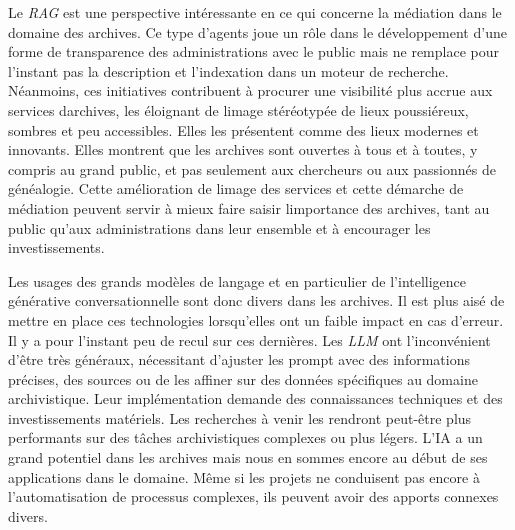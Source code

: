 		
		Le \emph{RAG} est une perspective intéressante en ce qui concerne la médiation dans le domaine des
	archives. Ce type d'agents joue
	un rôle dans le développement d'une forme de transparence des
	administrations avec le public mais ne remplace pour l'instant pas la
	description et l'indexation dans un moteur de recherche. Néanmoins, ces
	initiatives contribuent à procurer une visibilité plus accrue aux
	services d\textquotesingle archives, les éloignant de
	l\textquotesingle image stéréotypée de lieux poussiéreux, sombres et peu
	accessibles. Elles les présentent comme des lieux modernes et innovants.
	Elles montrent que les archives sont ouvertes à tous et à toutes, y compris au grand
	public, et pas seulement aux chercheurs ou aux passionnés de généalogie.
	Cette amélioration de l\textquotesingle image des services et cette
	démarche de médiation peuvent servir à mieux faire saisir
	l\textquotesingle importance des archives, tant au public qu'aux
	administrations dans leur ensemble et à encourager les
	investissements.\newline
	
	Les usages des grands modèles de langage et en particulier de
	l'intelligence générative conversationnelle sont donc divers dans les
	archives. Il est plus aisé de mettre en place ces technologies
	lorsqu'elles ont un faible impact en cas d'erreur. Il y a pour l'instant
	peu de recul sur ces dernières. Les \emph{LLM} ont l'inconvénient d'être
	très généraux, nécessitant d'ajuster les prompt avec des informations
	précises, des sources ou de les affiner sur des données spécifiques au
	domaine archivistique. Leur implémentation demande des connaissances
	techniques et des investissements matériels. Les recherches à venir les
	rendront peut-être plus performants sur des tâches archivistiques
	complexes ou plus légers. L'IA a un grand potentiel dans les archives
	mais nous en sommes encore au début de ses applications dans le domaine.
	Même si les projets ne conduisent pas encore à l'automatisation de
	processus complexes, ils peuvent avoir des apports connexes divers.
	
